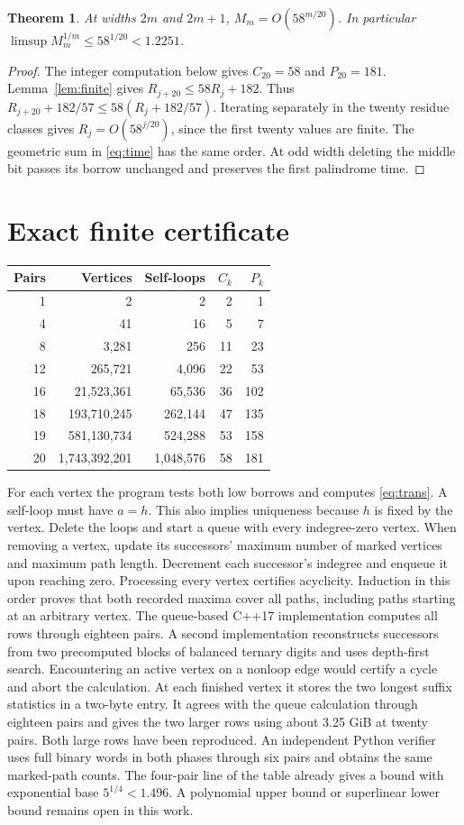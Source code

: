 \documentclass[11pt]{article}
\newtheorem{theorem}{Theorem}
\begin{document}
\begin{theorem}
At widths $2m$ and $2m+1$, $M_m=O(58^{m/20})$. In particular $\limsup M_m^{1/m}\le58^{1/20}<1.2251$.
\end{theorem}
\begin{proof}
The integer computation below gives $C_{20}=58$ and $P_{20}=181$. Lemma~\ref{lem:finite} gives $R_{j+20}\le58R_j+182$. Thus $R_{j+20}+182/57\le58(R_j+182/57)$. Iterating separately in the twenty residue classes gives $R_j=O(58^{j/20})$, since the first twenty values are finite. The geometric sum in \eqref{eq:time} has the same order. At odd width deleting the middle bit passes its borrow unchanged and preserves the first palindrome time.\end{proof}

\section{Exact finite certificate}
\begin{center}
\begin{tabular}{rrrrr}\toprule
Pairs & Vertices & Self-loops & $C_k$ & $P_k$\\\midrule
1&2&2&2&1\\
4&41&16&5&7\\
8&3,281&256&11&23\\
12&265,721&4,096&22&53\\
16&21,523,361&65,536&36&102\\
18&193,710,245&262,144&47&135\\
19&581,130,734&524,288&53&158\\
20&1,743,392,201&1,048,576&58&181\\\bottomrule
\end{tabular}
\end{center}
For each vertex the program tests both low borrows and computes \eqref{eq:trans}. A self-loop must have $a=h$. This also implies uniqueness because $h$ is fixed by the vertex. Delete the loops and start a queue with every indegree-zero vertex. When removing a vertex, update its successors' maximum number of marked vertices and maximum path length. Decrement each successor's indegree and enqueue it upon reaching zero. Processing every vertex certifies acyclicity. Induction in this order proves that both recorded maxima cover all paths, including paths starting at an arbitrary vertex. The queue-based C++17 implementation computes all rows through eighteen pairs. A second implementation reconstructs successors from two precomputed blocks of balanced ternary digits and uses depth-first search. Encountering an active vertex on a nonloop edge would certify a cycle and abort the calculation. At each finished vertex it stores the two longest suffix statistics in a two-byte entry. It agrees with the queue calculation through eighteen pairs and gives the two larger rows using about 3.25 GiB at twenty pairs. Both large rows have been reproduced. An independent Python verifier uses full binary words in both phases through six pairs and obtains the same marked-path counts. The four-pair line of the table already gives a bound with exponential base $5^{1/4}<1.496$. A polynomial upper bound or superlinear lower bound remains open in this work.
\end{document}
